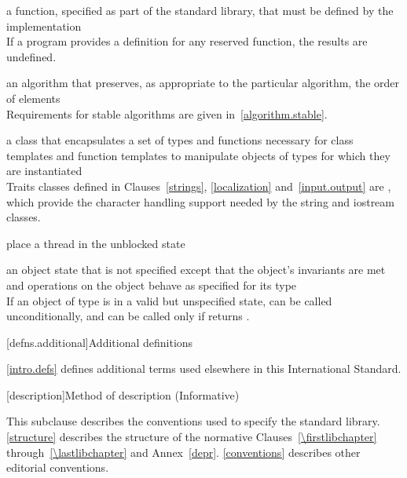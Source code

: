 %
a function, specified as part of the \Cpp standard library, that must be defined by the
implementation\\
\enternote
If a \Cpp program provides a definition for any reserved function, the results are undefined.%
\exitnote

%
%
an algorithm that preserves, as appropriate to the particular algorithm, the order
of elements\\
\enternote Requirements for stable algorithms are given in~\ref{algorithm.stable}. \exitnote

%
a class that encapsulates a set of types and functions necessary for class templates and
function templates to manipulate objects of types for which they are instantiated\\
\enternote
Traits classes defined in Clauses~\ref{strings}, \ref{localization} and~\ref{input.output} are
, which provide the character handling support needed by the string and
iostream classes.
\exitnote

%
place a thread in the unblocked state

%
an object state that is not specified except that the object's invariants are
met and operations on the object behave as specified for its type\\
\enterexample If an object  of type  is in a
valid but unspecified state,  can be called unconditionally,
and  can be called only if  returns
. \exitexample

[defns.additional]{Additional definitions}

\pnum
\ref{intro.defs} defines additional terms used elsewhere in this International Standard.

[description]{Method of description (Informative)}

\pnum
This subclause describes the conventions used to specify the \Cpp standard
library. \ref{structure} describes the structure of the normative
Clauses~\ref{\firstlibchapter} through~\ref{\lastlibchapter} and
Annex~\ref{depr}. \ref{conventions} describes other editorial conventions.

